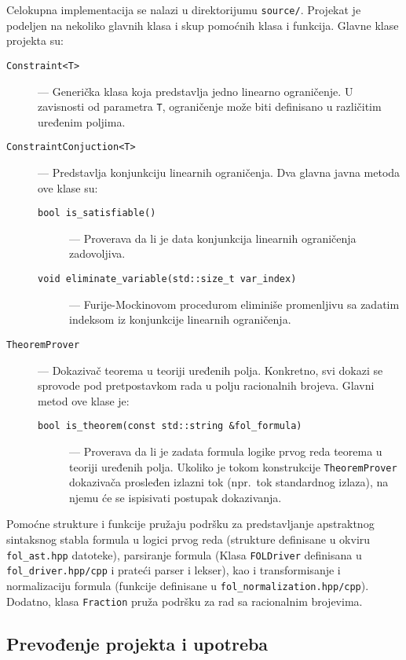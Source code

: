 \documentclass[a4paper,10pt]{article}
\begin{document}
Celokupna implementacija se nalazi u direktorijumu \texttt{source/}. Projekat je podeljen na nekoliko glavnih klasa i skup pomoćnih klasa i funkcija. Glavne klase projekta su:

\begin{description}
    \item[\texttt{Constraint<T>}] --- Generička klasa koja predstavlja jedno linearno ograničenje. U zavisnosti od parametra \texttt{T}, ograničenje može biti definisano u različitim uređenim poljima.
    \item[\texttt{ConstraintConjuction<T>}] --- Predstavlja konjunkciju linearnih ograničenja. Dva glavna javna metoda ove klase su:
        \begin{description}
            \item[\texttt{bool is\_satisfiable()}] --- Proverava da li je data konjunkcija linearnih ograničenja zadovoljiva.
            \item[\texttt{void eliminate\_variable(std::size\_t var\_index)}] --- Furije-Mockinovom procedurom eliminiše promenljivu sa zadatim indeksom iz konjunkcije linearnih ograničenja.
        \end{description}
    \item[\texttt{TheoremProver}] --- Dokazivač teorema u teoriji uređenih polja. Konkretno, svi dokazi se sprovode pod pretpostavkom rada u polju racionalnih brojeva. Glavni metod ove klase je:
    \begin{description}
        \item[\texttt{bool is\_theorem(const std::string \&fol\_formula)}] --- Proverava da li je zadata formula logike prvog reda teorema u teoriji uređenih polja. Ukoliko je tokom konstrukcije \texttt{TheoremProver} dokazivača prosleđen izlazni tok (npr.~tok standardnog izlaza), na njemu će se ispisivati postupak dokazivanja.
    \end{description}
\end{description}

Pomoćne strukture i funkcije pružaju podršku za predstavljanje apstraktnog sintaksnog stabla formula u logici prvog reda (strukture definisane u okviru \texttt{fol\_ast.hpp} datoteke), parsiranje formula (Klasa \texttt{FOLDriver} definisana u \texttt{fol\_driver.hpp/cpp} i prateći parser i lekser), kao i transformisanje i normalizaciju formula (funkcije definisane u \texttt{fol\_normalization.hpp/cpp}). Dodatno, klasa \texttt{Fraction} pruža podršku za rad sa racionalnim brojevima.

\subsection{Prevođenje projekta i upotreba}
\end{document}
